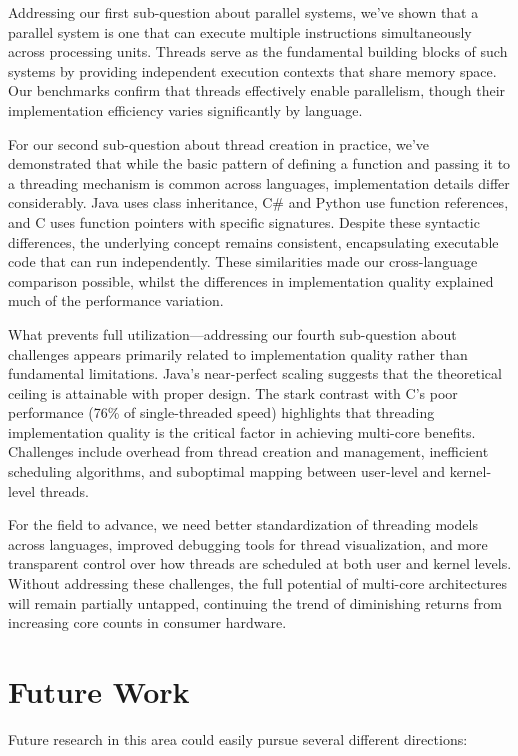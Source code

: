 \documentclass[12pt,a4paper]{article}
\begin{document}
Addressing our first sub-question about parallel systems, we've shown that a parallel system is one that can execute multiple instructions simultaneously across processing units. Threads serve as the fundamental building blocks of such systems by providing independent execution contexts that share memory space. Our benchmarks confirm that threads effectively enable parallelism, though their implementation efficiency varies significantly by language.

For our second sub-question about thread creation in practice, we've demonstrated that while the basic pattern of defining a function and passing it to a threading mechanism is common across languages, implementation details differ considerably. Java uses class inheritance, C\# and Python use function references, and C uses function pointers with specific signatures. Despite these syntactic differences, the underlying concept remains consistent, encapsulating executable code that can run independently. These similarities made our cross-language comparison possible, whilst the differences in implementation quality explained much of the performance variation.

What prevents full utilization—addressing our fourth sub-question about challenges appears primarily related to implementation quality rather than fundamental limitations. Java's near-perfect scaling suggests that the theoretical ceiling is attainable with proper design. The stark contrast with C's poor performance (76\% of single-threaded speed) highlights that threading implementation quality is the critical factor in achieving multi-core benefits. Challenges include overhead from thread creation and management, inefficient scheduling algorithms, and suboptimal mapping between user-level and kernel-level threads.

For the field to advance, we need better standardization of threading models across languages, improved debugging tools for thread visualization, and more transparent control over how threads are scheduled at both user and kernel levels. Without addressing these challenges, the full potential of multi-core architectures will remain partially untapped, continuing the trend of diminishing returns from increasing core counts in consumer hardware.

\section{Future Work}

Future research in this area could easily pursue several different directions:
\end{document}
